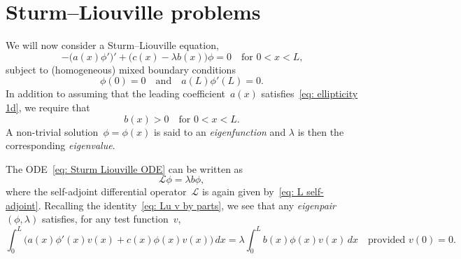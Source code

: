 \section{Sturm--Liouville problems}\label{sec: Sturm-Liouville}

We will now consider a Sturm--Liouville equation,
\begin{equation}\label{eq: Sturm Liouville ODE}
-\bigl(a(x)\phi'\bigr)'+\bigl(c(x)-\lambda b(x)\bigr)\phi=0\quad
	\text{for $0<x<L$,}
\end{equation}
subject to (homogeneous) mixed boundary conditions
\begin{equation}\label{eq: Sturm Liouville bc}
\phi(0)=0\quad\text{and}\quad a(L)\phi'(L)=0.
\end{equation}
In addition to assuming that the leading coefficient~$a(x)$ 
satisfies~\eqref{eq: ellipticity 1d}, we require that
\begin{equation}\label{eq: b>0}
b(x)>0\quad\text{for $0<x<L$.}
\end{equation}
A non-trivial solution~$\phi=\phi(x)$ is said to an \emph{eigenfunction} and 
$\lambda$ is then the corresponding \emph{eigenvalue}.  

The ODE~\eqref{eq: Sturm Liouville ODE} can be written as
\[
\mathcal{L}\phi=\lambda b\phi,
\]
where the self-adjoint differential operator~$\mathcal{L}$ is again given 
by~\eqref{eq: L self-adjoint}.  Recalling the 
identity~\eqref{eq: Lu v by parts}, we see that any \emph{eigenpair} 
$(\phi,\lambda)$ satisfies, for any test function~$v$,
\[
\int_0^L\bigl(a(x)\phi'(x)v(x)+c(x)\phi(x)v(x)\bigr)\,dx
	=\lambda\int_0^Lb(x)\phi(x)v(x)\,dx
\quad\text{provided $v(0)=0$.}
\]

